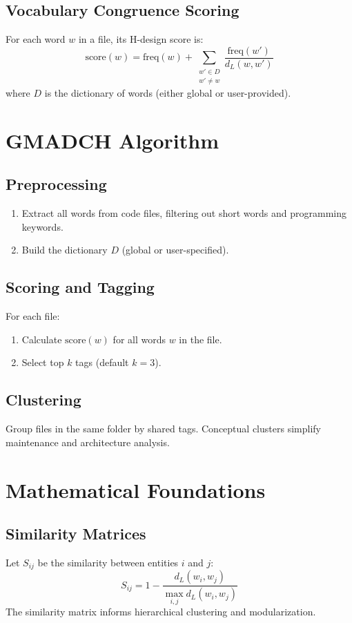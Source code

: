 \documentclass[a4paper,12pt]{article}
\begin{document}
\subsection{Vocabulary Congruence Scoring}
For each word $w$ in a file, its H-design score is:
\[
\text{score}(w) = \text{freq}(w) + \sum_{\substack{w' \in D\\w' \neq w}} \frac{\text{freq}(w')}{d_L(w, w')}
\]
where $D$ is the dictionary of words (either global or user-provided).

\section{GMADCH Algorithm}
\subsection{Preprocessing}
\begin{enumerate}
    \item Extract all words from code files, filtering out short words and programming keywords.
    \item Build the dictionary $D$ (global or user-specified).
\end{enumerate}

\subsection{Scoring and Tagging}
For each file:
\begin{enumerate}
    \item Calculate $\text{score}(w)$ for all words $w$ in the file.
    \item Select top $k$ tags (default $k=3$).
\end{enumerate}

\subsection{Clustering}
Group files in the same folder by shared tags. Conceptual clusters simplify maintenance and architecture analysis.

\section{Mathematical Foundations}
\subsection{Similarity Matrices}
Let $S_{ij}$ be the similarity between entities $i$ and $j$:
\[
S_{ij} = 1 - \frac{d_L(w_i, w_j)}{\max_{i,j} d_L(w_i, w_j)}
\]
The similarity matrix informs hierarchical clustering and modularization.
\end{document}
